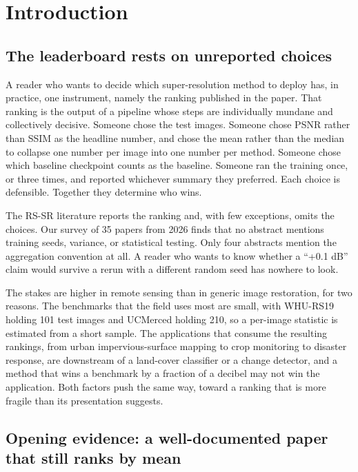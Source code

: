 \documentclass{interact}
\begin{document}
\section{Introduction}\label{sec:introduction}

\subsection{The leaderboard rests on unreported choices}\label{sec:unreported}

A reader who wants to decide which super-resolution method to deploy has, in practice, one instrument, namely the ranking published in the paper. That ranking is the output of a pipeline whose steps are individually mundane and collectively decisive. Someone chose the test images. Someone chose PSNR rather than SSIM as the headline number, and chose the mean rather than the median to collapse one number per image into one number per method. Someone chose which baseline checkpoint counts as the baseline. Someone ran the training once, or three times, and reported whichever summary they preferred. Each choice is defensible. Together they determine who wins.

The RS-SR literature reports the ranking and, with few exceptions, omits the choices. Our survey of 35 papers from 2026 finds that no abstract mentions training seeds, variance, or statistical testing. Only four abstracts mention the aggregation convention at all. A reader who wants to know whether a ``+0.1 dB'' claim would survive a rerun with a different random seed has nowhere to look.

The stakes are higher in remote sensing than in generic image restoration, for two reasons. The benchmarks that the field uses most are small, with WHU-RS19 holding 101 test images and UCMerced holding 210, so a per-image statistic is estimated from a short sample. The applications that consume the resulting rankings, from urban impervious-surface mapping to crop monitoring to disaster response, are downstream of a land-cover classifier or a change detector, and a method that wins a benchmark by a fraction of a decibel may not win the application. Both factors push the same way, toward a ranking that is more fragile than its presentation suggests.

\subsection{Opening evidence: a well-documented paper that still ranks by mean}\label{sec:opening}
\end{document}
